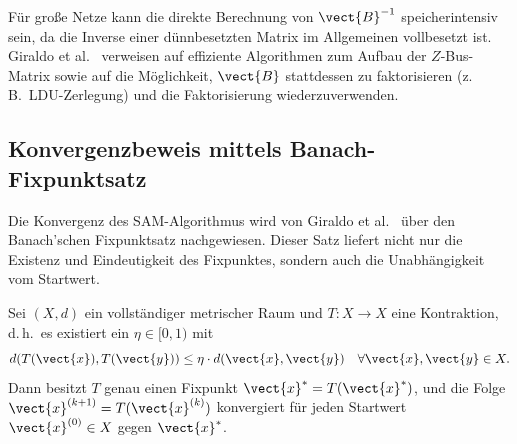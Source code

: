 Für große Netze kann die direkte Berechnung von $\vect{B}^{-1}$ speicherintensiv sein, da die Inverse einer dünnbesetzten Matrix im Allgemeinen vollbesetzt ist. Giraldo et al.\ \cite{Giraldo2022} verweisen auf effiziente Algorithmen zum Aufbau der $Z$-Bus-Matrix \cite{Davis2006} sowie auf die Möglichkeit, $\vect{B}$ stattdessen zu faktorisieren (z.\,B.\ LDU-Zerlegung) und die Faktorisierung wiederzuverwenden.
%

\subsection{Konvergenzbeweis mittels Banach-Fixpunktsatz}
\label{subsec:banach}

Die Konvergenz des SAM-Algorithmus wird von Giraldo et al.\ \cite{Giraldo2022} über den Banach'schen Fixpunktsatz nachgewiesen. Dieser Satz liefert nicht nur die Existenz und Eindeutigkeit des Fixpunktes, sondern auch die Unabhängigkeit vom Startwert.

\begin{theorem}
	\label{thm:banach}
	Sei $(X, d)$ ein vollständiger metrischer Raum und $T: X \to X$ eine Kontraktion, d.\,h.\ es existiert ein $\eta \in [0, 1)$ mit
	\begin{equation}
		d(T(\vect{x}), T(\vect{y})) \leq \eta \cdot d(\vect{x}, \vect{y}) \quad \forall \vect{x}, \vect{y} \in X.
		\label{eq:kontraktion_def}
	\end{equation}
	Dann besitzt $T$ genau einen Fixpunkt $\vect{x}^* = T(\vect{x}^*)$, und die Folge $\vect{x}^{(k+1)} = T(\vect{x}^{(k)})$ konvergiert für jeden Startwert $\vect{x}^{(0)} \in X$ gegen $\vect{x}^*$.
\end{theorem}

